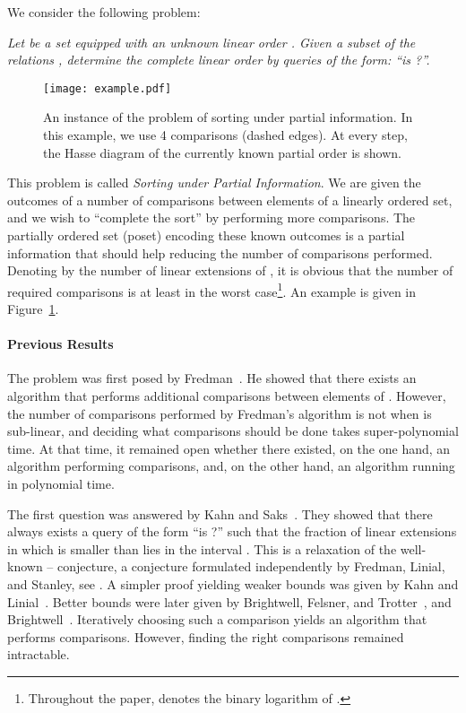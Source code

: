 \documentclass{article} \usepackage{fullpage}
\begin{document}
We consider the following problem:\medskip

{\it Let  be a set equipped with an unknown linear order . Given a subset of the relations , determine the complete linear order by queries of the form: ``is ?''.}\medskip

\begin{figure}
\begin{center}
\texttt{[image: example.pdf]}
\end{center}
\caption{\label{fig:example}An instance of the problem of sorting under partial information. In this example, we use 4 comparisons (dashed edges). At every step, the Hasse diagram of the currently known partial order is shown.}
\end{figure}

This problem is called {\it Sorting under Partial Information}. We are given the outcomes of a number of comparisons between elements of a linearly ordered set, and we wish to ``complete the sort'' by performing more comparisons. The partially ordered set (poset)  encoding these known outcomes is a partial information that should help reducing the number of comparisons performed. Denoting by  the number of linear extensions of , it is obvious that the number of required comparisons is at least  in the worst case\footnote{Throughout the paper,  denotes the binary logarithm of .}. An example is given in Figure~\ref{fig:example}.

\paragraph*{Previous Results}

The problem was first posed by Fredman~\cite{F76}. He showed that there exists an algorithm that performs  additional comparisons between elements of . However, the number of comparisons performed by Fredman's algorithm is not  when  is sub-linear, and deciding what comparisons should be done takes super-polynomial time. At that time, it remained open whether there existed, on the one hand, an algorithm performing  comparisons, and, on the other hand, an algorithm running in polynomial time.

The first question was answered by Kahn and Saks~\cite{KS84j}. They showed that there always exists a query of the form ``is ?'' such that the fraction of linear extensions in which  is smaller than  lies in the interval . This is a relaxation of the well-known -- conjecture, a conjecture formulated independently by Fredman, Linial, and Stanley, see \cite{L84}. A simpler proof yielding weaker bounds was given by Kahn and Linial~\cite{KL91}. Better bounds were later given by Brightwell, Felsner, and Trotter~\cite{BFT95}, and Brightwell~\cite{B99}. Iteratively choosing such a comparison yields an algorithm that performs  comparisons. However, finding the right comparisons remained intractable.
\end{document}
